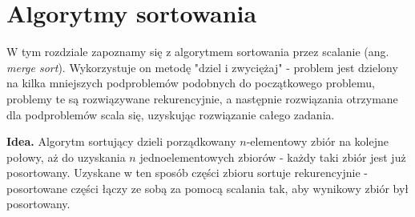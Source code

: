 \section{Algorytmy sortowania}

\label{sec:merge-sort}

W tym rozdziale zapoznamy się z algorytmem sortowania przez scalanie (ang. \textit{merge sort}). 
Wykorzystuje on metodę "dziel i zwyciężaj" - problem jest dzielony na kilka mniejszych podproblemów podobnych do początkowego problemu, problemy te są rozwiązywane rekurencyjnie, a następnie rozwiązania otrzymane dla podproblemów scala się, uzyskując rozwiązanie całego zadania.

\textbf{Idea.} Algorytm sortujący dzieli porządkowany $n$-elementowy zbiór na kolejne połowy, aż do uzyskania $n$ jednoelementowych zbiorów - każdy taki zbiór jest już posortowany. 
Uzyskane w ten sposób części zbioru sortuje rekurencyjnie - posortowane części łączy ze sobą za pomocą scalania tak, aby wynikowy zbiór był posortowany.

